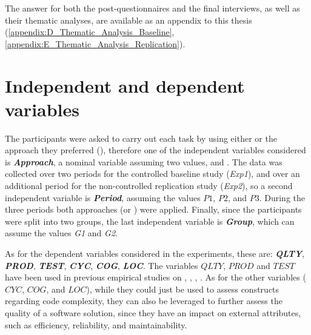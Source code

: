The answer for both the post-questionnaires and the final interviews, as well as their thematic analyses, are available as an appendix to this thesis (\ref{appendix:D_Thematic_Analysis_Baseline}, \ref{appendix:E_Thematic_Analysis_Replication}).



\section{Independent and dependent variables}
The participants were asked to carry out each task by using either \tdd or the approach they preferred (\notdd), therefore one of the independent variables considered is \textbf{\textit{Approach}}, a nominal variable assuming two values, \tdd and \notdd. The data was collected over two periods for the controlled baseline study (\textit{Exp1}), and over an additional period for the non-controlled replication study (\textit{Exp2}), so a second independent variable is \textbf{\textit{Period}}, assuming the values $P1$, $P2$, and $P3$. During the three periods both approaches (\tdd or \notdd) were applied. Finally, since the participants were split into two groups, the last independent variable is \textbf{\textit{Group}}, which can assume the values \textit{G1} and \textit{G2}.

As for the dependent variables considered in the experiments, these are: \textbf{\textit{QLTY}}, \textbf{\textit{PROD}}, \textbf{\textit{TEST}}, \textbf{\textit{CYC}}, \textbf{\textit{COG}}, \textbf{\textit{LOC}}.
The variables $QLTY$, $PROD$ and $TEST$ have been used in previous empirical studies on \noess \cite{DBLP:journals/tse/ErdogmusMT05}, \cite{DBLP:journals/tse/FucciETOJ17}, \cite{DBLP:conf/esem/Fucci0BCSTJ18}, \cite{DBLP:journals/ese/TosunDFVTESOTJJ17}. 
As for the other variables (\ie $CYC$, $COG$, and $LOC$), while they could just be used to assess constructs regarding code complexity, they can also be leveraged to further assess the quality of a software solution, since they have an impact on external attributes, such as efficiency, reliability, and maintainability.

